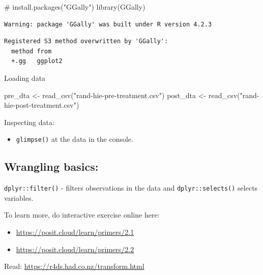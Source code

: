 \documentclass[
  letterpaper,
  DIV=11,
  numbers=noendperiod]{scrartcl}
\newenvironment{Shaded}{\begin{snugshade}}{\end{snugshade}}
\newcommand{\CommentTok}[1]{\textcolor[rgb]{0.37,0.37,0.37}{#1}}
\newcommand{\FunctionTok}[1]{\textcolor[rgb]{0.28,0.35,0.67}{#1}}
\newcommand{\NormalTok}[1]{\textcolor[rgb]{0.00,0.23,0.31}{#1}}
\newcommand{\OtherTok}[1]{\textcolor[rgb]{0.00,0.23,0.31}{#1}}
\newcommand{\StringTok}[1]{\textcolor[rgb]{0.13,0.47,0.30}{#1}}
\providecommand{\tightlist}{%
  \setlength{\itemsep}{0pt}\setlength{\parskip}{0pt}}\usepackage{longtable,booktabs,array}
\begin{document}
\begin{Shaded}
\begin{Highlighting}[]
\CommentTok{\# install.packages("GGally")}
\FunctionTok{library}\NormalTok{(GGally)  }
\end{Highlighting}
\end{Shaded}

\begin{verbatim}
Warning: package 'GGally' was built under R version 4.2.3
\end{verbatim}

\begin{verbatim}
Registered S3 method overwritten by 'GGally':
  method from   
  +.gg   ggplot2
\end{verbatim}

Loading data

\begin{Shaded}
\begin{Highlighting}[]
\NormalTok{pre\_dta }\OtherTok{\textless{}{-}} \FunctionTok{read\_csv}\NormalTok{(}\StringTok{"rand{-}hie{-}pre{-}treatment.csv"}\NormalTok{)}
\NormalTok{post\_dta }\OtherTok{\textless{}{-}}  \FunctionTok{read\_csv}\NormalTok{(}\StringTok{"rand{-}hie{-}post{-}treatment.csv"}\NormalTok{)}
\end{Highlighting}
\end{Shaded}

Inspecting data:

\begin{itemize}
\tightlist
\item
  \texttt{glimpse()} at the data in the console.
\end{itemize}

\hypertarget{wrangling-basics}{%
\subsection{Wrangling basics:}\label{wrangling-basics}}

\texttt{dplyr::filter()} - filters observations in the data and
\texttt{dplyr::selects()} selects variables.

To learn more, do interactive exercise online here:

\begin{itemize}
\item
  \url{https://posit.cloud/learn/primers/2.1}
\item
  \url{https://posit.cloud/learn/primers/2.2}
\end{itemize}

Read: \url{https://r4ds.had.co.nz/transform.html}
\end{document}
